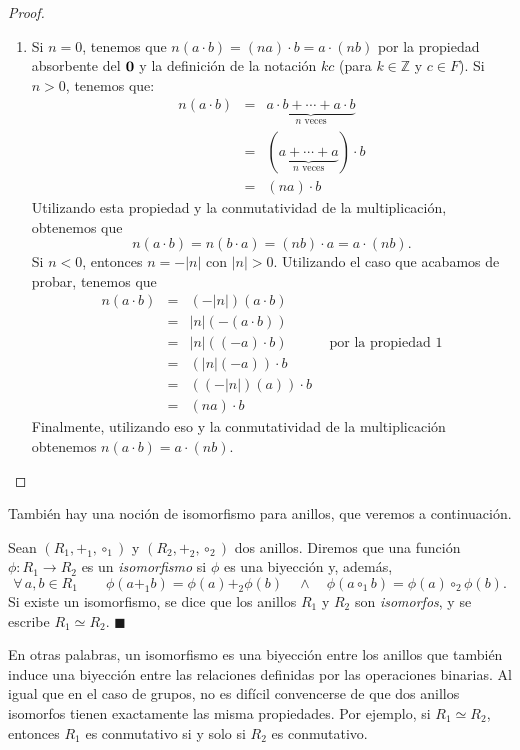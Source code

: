 \begin{proof}
\begin{enumerate}
        \item Si $n = 0$, tenemos que $n(a\cdot b) = (na)\cdot b = a \cdot (nb)$ por la propiedad absorbente del $\mathbf{0}$ y la definición de la notación $kc$ (para $k \in \mathbb{Z}$ y $c \in F$). Si $n > 0$, tenemos que:
        \begin{eqnarray*}
            n(a\cdot b)&=&\underbrace{a\cdot b +\cdots + a\cdot b}_\text{$n$ veces}\\
            &=&(\underbrace{a +\cdots + a}_\text{$n$ veces}) \cdot b\\
            &=&(na) \cdot b
        \end{eqnarray*}		
    Utilizando esta propiedad y la conmutatividad de la multiplicación, obtenemos que $$n(a\cdot b) = n(b \cdot a) = (nb) \cdot a = a \cdot (nb).$$ Si $n < 0$, entonces 
    $n = -|n|$ con $|n| > 0$. Utilizando el caso que acabamos de probar, tenemos que
        \begin{eqnarray*}
            n(a\cdot b)&=& (-|n|)(a \cdot b)\\
            &=& |n|(-(a \cdot b))\\
            &=& |n|((-a) \cdot b) \quad\quad\quad \text{por la propiedad 1}\\
            &=& (|n|(-a)) \cdot b\\
            &=& ((-|n|)(a)) \cdot b\\
            &=& (na) \cdot b
        \end{eqnarray*}
        Finalmente, utilizando eso y la conmutatividad de la multiplicación obtenemos $n(a\cdot b) = a \cdot (nb)$. 
        \qedhere
        \end{enumerate}
    \end{proof}

También hay una noción de isomorfismo para anillos, que veremos a continuación.

\begin{definition}
    Sean $(R_1, +_1, \circ_1)$ y $(R_2, +_2, \circ_2)$ dos anillos. Diremos que una función $\phi\colon R_1 \rightarrow R_2$ es un \emph{isomorfismo} si $\phi$ es una biyección y, además,
    $$\forall\, a, b \in R_1 \qquad \phi(a +_1 b) = \phi(a) +_2 \phi(b) \quad \land \quad \phi(a \circ_1 b) = \phi(a) \circ_2 \phi(b).$$
    Si existe un isomorfismo, se dice que los anillos $R_1$ y $R_2$ son \emph{isomorfos}, y se escribe $R_1 \simeq R_2$. \hfill$\blacksquare$
    \end{definition}
    
    En otras palabras, un isomorfismo es una biyección entre los anillos que también induce una biyección entre las relaciones definidas por las operaciones binarias. 
    Al igual que en el caso de grupos, no es difícil convencerse de que dos anillos isomorfos tienen exactamente las misma propiedades. Por ejemplo, si $R_1 \simeq R_2$, entonces $R_1$ es conmutativo si y solo si $R_2$ es conmutativo.


